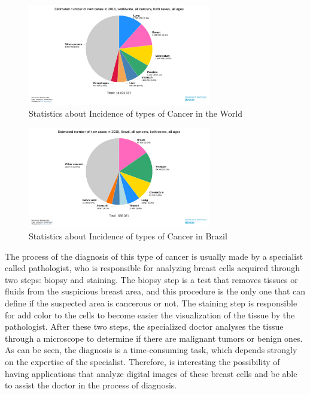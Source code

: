 \documentclass[conference]{IEEEtran}
\begin{document}
		\begin{figure}[h]
		    \centering
		    \includegraphics[width=8cm]{images/graphic1.png}
		    \caption{Statistics about Incidence of types of Cancer in the World \cite{GLOBOCAN}}
		    \label{fig:graphic1}
		\end{figure}
		
		\begin{figure}[h]
		    \centering
		    \includegraphics[width=8cm]{images/graphic2.png}
		    \caption{Statistics about Incidence of types of Cancer in Brazil \cite{GLOBOCAN}}
		    \label{fig:graphic2}
		\end{figure}
		
		\par The process of the diagnosis of this type of cancer is usually made by a specialist called pathologist, who is responsible for analyzing breast cells acquired through two steps: biopsy and staining. The biopsy step is a test that removes tissues or fluids from the suspicious breast area, and this procedure is the only one that can define if the suspected area is cancerous or not. The staining step is responsible for add color to the cells to become easier the visualization of the tissue by the pathologist. After these two steps, the specialized doctor analyses the tissue through a microscope to determine if there are malignant tumors or benign ones. As can be seen, the diagnosis is a time-consuming task, which depends strongly on the expertise of the specialist. Therefore, is interesting the possibility of having applications that analyze digital images of these breast cells and be able to assist the doctor in the process of diagnosis. 
		
\end{document}

